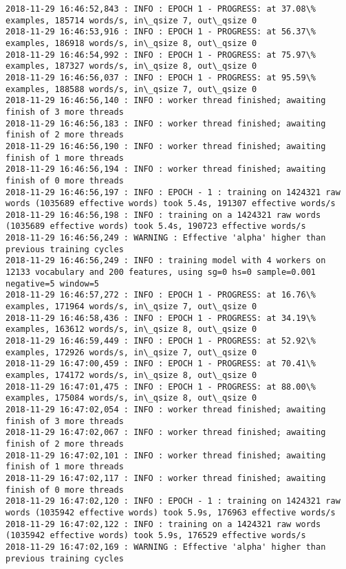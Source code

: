 \documentclass[11pt]{article}
\begin{document}
\begin{Verbatim}[commandchars=\\\{\}]
2018-11-29 16:46:52,843 : INFO : EPOCH 1 - PROGRESS: at 37.08\% examples, 185714 words/s, in\_qsize 7, out\_qsize 0
2018-11-29 16:46:53,916 : INFO : EPOCH 1 - PROGRESS: at 56.37\% examples, 186918 words/s, in\_qsize 8, out\_qsize 0
2018-11-29 16:46:54,992 : INFO : EPOCH 1 - PROGRESS: at 75.97\% examples, 187327 words/s, in\_qsize 8, out\_qsize 0
2018-11-29 16:46:56,037 : INFO : EPOCH 1 - PROGRESS: at 95.59\% examples, 188588 words/s, in\_qsize 7, out\_qsize 0
2018-11-29 16:46:56,140 : INFO : worker thread finished; awaiting finish of 3 more threads
2018-11-29 16:46:56,183 : INFO : worker thread finished; awaiting finish of 2 more threads
2018-11-29 16:46:56,190 : INFO : worker thread finished; awaiting finish of 1 more threads
2018-11-29 16:46:56,194 : INFO : worker thread finished; awaiting finish of 0 more threads
2018-11-29 16:46:56,197 : INFO : EPOCH - 1 : training on 1424321 raw words (1035689 effective words) took 5.4s, 191307 effective words/s
2018-11-29 16:46:56,198 : INFO : training on a 1424321 raw words (1035689 effective words) took 5.4s, 190723 effective words/s
2018-11-29 16:46:56,249 : WARNING : Effective 'alpha' higher than previous training cycles
2018-11-29 16:46:56,249 : INFO : training model with 4 workers on 12133 vocabulary and 200 features, using sg=0 hs=0 sample=0.001 negative=5 window=5
2018-11-29 16:46:57,272 : INFO : EPOCH 1 - PROGRESS: at 16.76\% examples, 171964 words/s, in\_qsize 7, out\_qsize 0
2018-11-29 16:46:58,436 : INFO : EPOCH 1 - PROGRESS: at 34.19\% examples, 163612 words/s, in\_qsize 8, out\_qsize 0
2018-11-29 16:46:59,449 : INFO : EPOCH 1 - PROGRESS: at 52.92\% examples, 172926 words/s, in\_qsize 7, out\_qsize 0
2018-11-29 16:47:00,459 : INFO : EPOCH 1 - PROGRESS: at 70.41\% examples, 174172 words/s, in\_qsize 8, out\_qsize 0
2018-11-29 16:47:01,475 : INFO : EPOCH 1 - PROGRESS: at 88.00\% examples, 175084 words/s, in\_qsize 8, out\_qsize 0
2018-11-29 16:47:02,054 : INFO : worker thread finished; awaiting finish of 3 more threads
2018-11-29 16:47:02,067 : INFO : worker thread finished; awaiting finish of 2 more threads
2018-11-29 16:47:02,101 : INFO : worker thread finished; awaiting finish of 1 more threads
2018-11-29 16:47:02,117 : INFO : worker thread finished; awaiting finish of 0 more threads
2018-11-29 16:47:02,120 : INFO : EPOCH - 1 : training on 1424321 raw words (1035942 effective words) took 5.9s, 176963 effective words/s
2018-11-29 16:47:02,122 : INFO : training on a 1424321 raw words (1035942 effective words) took 5.9s, 176529 effective words/s
2018-11-29 16:47:02,169 : WARNING : Effective 'alpha' higher than previous training cycles

\end{Verbatim}
\end{document}
